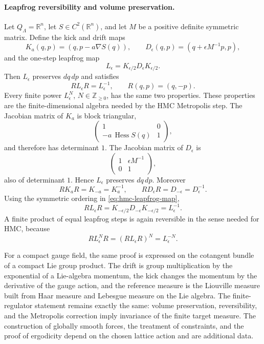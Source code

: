 \paragraph{Leapfrog reversibility and volume preservation.}
Let \(Q_\Lambda=\mathbb R^n\), let \(S\in C^2(\mathbb R^n)\), and let
\(M\) be a positive definite symmetric matrix.  Define the kick and drift
maps
\begin{equation}
  K_a(q,p)=(q,p-a\nabla S(q)),
  \qquad
  D_\epsilon(q,p)=(q+\epsilon M^{-1}p,p),
  \label{eq:hmc-kick-drift}
\end{equation}
and the one-step leapfrog map
\begin{equation}
  L_\epsilon=K_{\epsilon/2}D_\epsilon K_{\epsilon/2}.
  \label{eq:hmc-leapfrog-map}
\end{equation}
Then \(L_\epsilon\) preserves \(dq\,dp\) and satisfies
\begin{equation}
  R L_\epsilon R=L_\epsilon^{-1},
  \qquad R(q,p)=(q,-p).
  \label{eq:hmc-leapfrog-reversibility}
\end{equation}
Every finite power \(L_\epsilon^N\), \(N\in\mathbb Z_{\geq0}\), has the same
two properties.
These properties are the finite-dimensional algebra needed by the HMC
Metropolis step.  The Jacobian matrix of \(K_a\) is block triangular,
\[
  \begin{pmatrix}
    1 & 0\\
    -a\,\operatorname{Hess}S(q) & 1
  \end{pmatrix},
\]
and therefore has determinant \(1\).  The Jacobian matrix of \(D_\epsilon\)
is
\[
  \begin{pmatrix}
    1 & \epsilon M^{-1}\\
    0 & 1
  \end{pmatrix},
\]
also of determinant \(1\).  Hence \(L_\epsilon\) preserves \(dq\,dp\).
Moreover
\[
  RK_aR=K_{-a}=K_a^{-1},
  \qquad
  RD_\epsilon R=D_{-\epsilon}=D_\epsilon^{-1}.
\]
Using the symmetric ordering in \eqref{eq:hmc-leapfrog-map},
\[
  R L_\epsilon R
  =
  K_{-\epsilon/2}D_{-\epsilon}K_{-\epsilon/2}
  =
  L_\epsilon^{-1}.
\]
A finite product of equal leapfrog steps is again reversible in the sense
needed for HMC, because
\[
  R L_\epsilon^N R=(R L_\epsilon R)^N=L_\epsilon^{-N}.
\]

For a compact gauge field, the same proof is expressed on the cotangent
bundle of a compact Lie group product.  The drift is group multiplication by
the exponential of a Lie-algebra momentum, the kick changes the momentum by
the derivative of the gauge action, and the reference measure is the
Liouville measure built from Haar measure and Lebesgue measure on the Lie
algebra.  The finite-regulator statement remains exactly the same:
volume preservation, reversibility, and the Metropolis correction imply
invariance of the finite target measure.  The construction of globally
smooth forces, the treatment of constraints, and the proof of ergodicity
depend on the chosen lattice action and are additional data.

